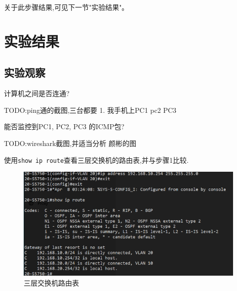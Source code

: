 \documentclass{myreport}
\begin{document}
关于此步骤结果,可见下一节"实验结果"。

\section{实验结果}

\subsection{实验观察}

\begin{tcolorbox}[title = {观察一}]
计算机之间是否连通?
\end{tcolorbox}

TODO:ping通的截图,三台都要
1. 我手机上PC1 pc2 PC3

\begin{tcolorbox}[title = {观察二}]
能否监控到PC1, PC2, PC3 的ICMP包?
\end{tcolorbox}

TODO:wireshark截图,并适当分析
颜彬的图

\begin{tcolorbox}[title = {观察三}]
使用\texttt{show ip route}查看三层交换机的路由表,并与步骤1比较.
\end{tcolorbox}

\begin{figure}[htp]
    \centering
    \includegraphics[width=13cm]{"./figure/2018-05-17-23-09-34.png"}
    \caption{三层交换机路由表}
    \label{fig:e2-s10-route}
\end{figure}
\end{document}
